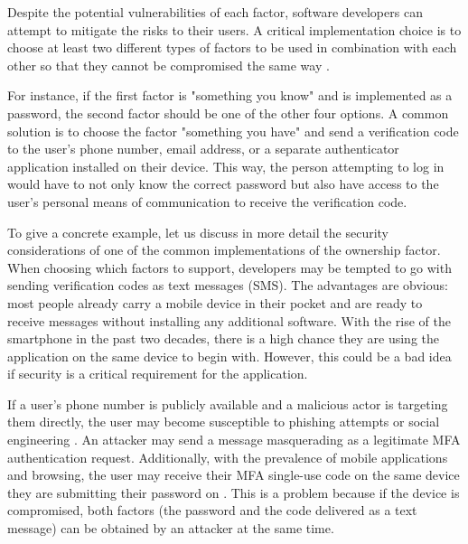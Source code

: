 Despite the potential vulnerabilities of each factor, software developers can attempt to mitigate the risks to their users. A critical implementation choice is to choose at least two different types of factors to be used in combination with each other so that they cannot be compromised the same way \citep{grassi_digital_2017, owasp_multifactor_2024}.

For instance, if the first factor is "something you know" and is implemented as a password, the second factor should be one of the other four options. A common solution is to choose the factor "something you have" and send a verification code to the user's phone number, email address, or a separate authenticator application installed on their device. This way, the person attempting to log in would have to not only know the correct password but also have access to the user's personal means of communication to receive the verification code.

To give a concrete example, let us discuss in more detail the security considerations of one of the common implementations of the ownership factor. When choosing which factors to support, developers may be tempted to go with sending verification codes as text messages (SMS). The advantages are obvious: most people already carry a mobile device in their pocket and are ready to receive messages without installing any additional software. With the rise of the smartphone in the past two decades, there is a high chance they are using the application on the same device to begin with. However, this could be a bad idea if security is a critical requirement for the application.

If a user's phone number is publicly available and a malicious actor is targeting them directly, the user may become susceptible to phishing attempts or social engineering \citep{owasp_multifactor_2024}. An attacker may send a message masquerading as a legitimate MFA authentication request. Additionally, with the prevalence of mobile applications and browsing, the user may receive their MFA single-use code on the same device they are submitting their password on \citep{owasp_multifactor_2024}. This is a problem because if the device is compromised, both factors (the password and the code delivered as a text message) can be obtained by an attacker at the same time.


